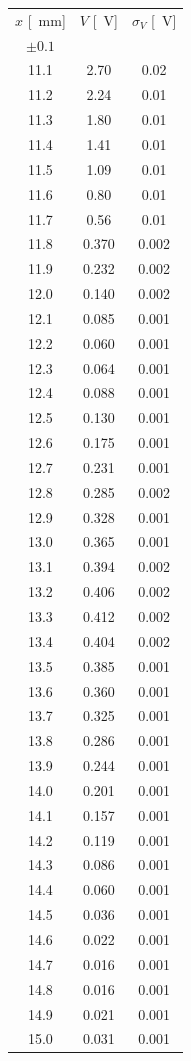 \documentclass[10pt,oneside,a4paper]{article}
\begin{document}
\begin{minipage}[t]{0.33\linewidth}
\vspace{0cm}
\begin{center}
\begin{tabular}{c|c|c}
$x$ [\SI{}{mm}] & $V$ [\SI{}{V}] & $\sigma_V$ [\SI{}{V}] \\
 $\pm 0.1$ & & \\
\hline
 11.1 & 2.70 & 0.02 \\
 11.2 & 2.24 & 0.01 \\
 11.3 & 1.80 & 0.01 \\
 11.4 & 1.41 & 0.01 \\
 11.5 & 1.09 & 0.01 \\
 11.6 & 0.80 & 0.01 \\
 11.7 & 0.56 & 0.01 \\
 11.8 & 0.370 & 0.002 \\
 11.9 & 0.232 & 0.002 \\
 12.0 & 0.140 & 0.002 \\
 12.1 & 0.085 & 0.001 \\
 12.2 & 0.060 & 0.001 \\
 12.3 & 0.064 & 0.001 \\
 12.4 & 0.088 & 0.001 \\
 12.5 & 0.130 & 0.001 \\
 12.6 & 0.175 & 0.001 \\
 12.7 & 0.231 & 0.001 \\
 12.8 & 0.285 & 0.002 \\
 12.9 & 0.328 & 0.001 \\
 13.0 & 0.365 & 0.001 \\
 13.1 & 0.394 & 0.002 \\
 13.2 & 0.406 & 0.002 \\
 13.3 & 0.412 & 0.002 \\
 13.4 & 0.404 & 0.002 \\
 13.5 & 0.385 & 0.001 \\
 13.6 & 0.360 & 0.001 \\
 13.7 & 0.325 & 0.001 \\
 13.8 & 0.286 & 0.001 \\
 13.9 & 0.244 & 0.001 \\
 14.0 & 0.201 & 0.001 \\
 14.1 & 0.157 & 0.001 \\
 14.2 & 0.119 & 0.001 \\
 14.3 & 0.086 & 0.001 \\
 14.4 & 0.060 & 0.001 \\
 14.5 & 0.036 & 0.001 \\
 14.6 & 0.022 & 0.001 \\
 14.7 & 0.016 & 0.001 \\
 14.8 & 0.016 & 0.001 \\
 14.9 & 0.021 & 0.001 \\
 15.0 & 0.031 & 0.001 \\
\hline
\end{tabular}
\end{center}
\end{minipage}
\end{document}
